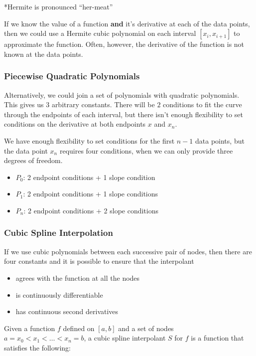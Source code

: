 \documentclass[12pt]{article}
\begin{document}
*Hermite is pronounced \enquote{her-meat}

If we know the value of a function \textbf{and} it's derivative at each of the
data points, then we could use a Hermite cubic polynomial on each interval
$[x_i, x_{i+1}]$ to approximate the function. Often, however, the derivative of
the function is not known at the data points.

\subsubsection{Piecewise Quadratic Polynomials}

Alternatively, we could join a set of polynomials with quadratic polynomials.
This gives us $3$ arbitrary constants. There will be $2$ conditions to fit the
curve through the endpoints of each interval, but there isn't enough flexibility
to set conditions on the derivative at both endpoints $x$ and $x_n$.

We have enough flexibility to set conditions for the first $n-1$ data points,
but the data point $x_n$ requires four conditions, when we can only provide
three degrees of freedom.

\begin{itemize}
\item $P_0$: 2 endpoint conditions + 1 slope condition
\item $P_1$: 2 endpoint conditions + 1 slope conditions
\item $P_n$: 2 endpoint conditions + 2 slope conditions
\end{itemize}

\subsubsection{Cubic Spline Interpolation}

If we use cubic polynomials between each successive pair of nodes, then there
are four constants and it is possible to ensure that the interpolant

\begin{itemize}
  \item agrees with the function at all the nodes
  \item is continuously differentiable
  \item has continuous second derivatives
\end{itemize}

Given a function $f$ defined on $[a, b]$ and a set of nodes
$a=x_0<x_1<\dots<x_n=b$, a cubic spline interpolant $S$ for $f$ is a function
that satisfies the following:
\end{document}
